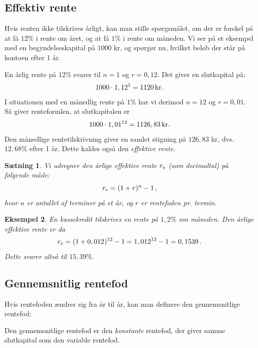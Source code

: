 \documentclass[12pt,oneside,a4paper]{article}
\newtheorem{thm}{Sætning}[section]
\newtheorem{eks}[thm]{Eksempel}
\begin{document}
\subsection{Effektiv rente}
Hvis renten ikke tilskrives årligt, kan man stille spørgsmålet, om der er
forskel på at få $12\%$ i rente om året, og at få $1\%$ i rente om måneden.  Vi
ser på et eksempel med en begyndelseskapital på $1000$ kr, og spørger nu, hvilket
beløb der står på kontoen efter 1 år.

En årlig rente på $12\%$ svarer til $n=1$ og $r=0,12$. Det giver en slutkapital
på:
\[
    1000 \cdot 1,12^1 = 1120 {\,\rm kr.}
\]
I situationen med en månedlig rente på $1\%$ har vi derimod $n=12$ og $r=0,01$.
Så giver renteformlen, at slutkapitalen er
\[
    1000\cdot 1,01^{12} = 1126,83 {\,\rm kr.}
\]
Den månedlige rentetilskrivning giver en samlet stigning på $126,83$ kr, dvs.
$12,68\%$ efter 1 år. Dette kaldes også den {\em effektive rente}.

\begin{tcolorbox}
\begin{thm}
    Vi udregner den årlige effektive rente $r_{\rm e}$ (som decimaltal) på
    følgende måde:
    \[
        r_{\rm e} = (1+r)^n-1\,,
    \]
hvor $n$ er antallet af terminer på et år, og $r$ er rentefoden pr. termin.
\end{thm}
\end{tcolorbox}
\begin{tcolorbox}
\begin{eks}
    En kassekredit tilskrives en rente på $1,2\%$ om måneden. Den årlige
    effektive rente er da
    \[
        r_{\rm e} = (1+0,012)^{12}-1 = 1,012^{12}-1 = 0,1539\,.
    \]
    Dette svarer altså til $15,39\%$.
\end{eks}
\end{tcolorbox}

\subsection{Gennemsnitlig rentefod}
Hvis rentefoden ændrer sig fra år til år, kan man definere den gennemsnitlige
rentefod:

\begin{tcolorbox}
Den gennemsnitlige rentefod er den \emph{konstante} rentefod, der giver samme
slutkapital som den variable rentefod.
\end{tcolorbox}
\end{document}
